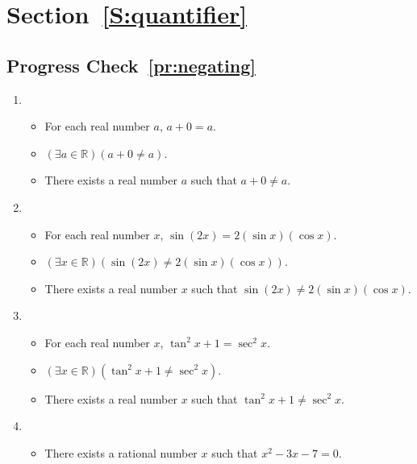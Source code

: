 \section*{Section~\ref{S:quantifier}}

\subsection*{Progress Check~\ref{pr:negating}}
\begin{enumerate}
\item \begin{itemize}
\item For each  real number  $a$,  $a + 0 = a$.

\item $(\exists a \in \mathbb{R})( a + 0 \ne a)$.

\item There exists a real number  $a$  such that  $a + 0 \ne a$.
\end{itemize}

\item \begin{itemize}
\item For each real number  $x$, 
$\sin ( {2x} ) = 2( {\sin x} )( {\cos x} )$.

\item $(\exists x \in \mathbb{R})( \sin ( {2x} ) \ne 2( {\sin x} )( {\cos x} ))$.

\item There exists a real number  $x$  such that  
$\sin \left( {2x} \right) \ne 2\left( {\sin x} \right)\left( {\cos x} \right)$.
\end{itemize}

\item \begin{itemize}
\item For each real number  $x$, $\tan ^2 x + 1 = \sec ^2 x$.

\item $\left( \exists x \in \mathbb{R}\right) \left( \tan ^2 x + 1 \ne \sec ^2 x \right)$.

\item There exists a real number  $x$  such that  $\tan ^2 x + 1 \ne \sec ^2 x$.
\end{itemize}

\item \begin{itemize}
\item There exists a rational number  $x$  such that  $x^2  - 3x - 7 = 0$.


\end{itemize}
\end{enumerate}
